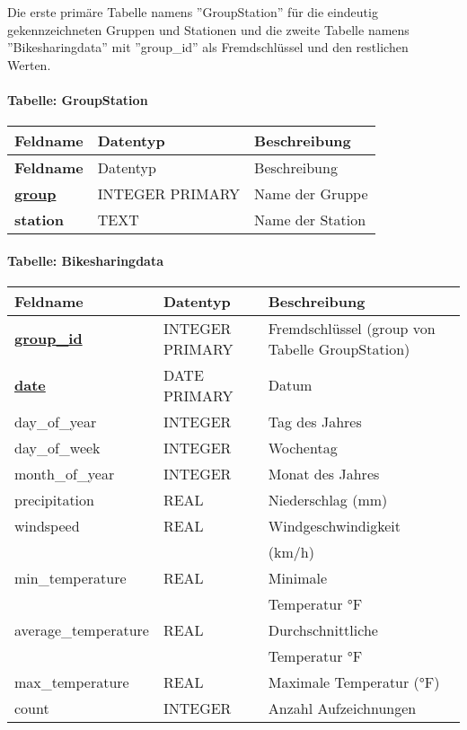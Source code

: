 \documentclass[11pt]{article}
\begin{document}
Die erste primäre Tabelle namens ''GroupStation'' für die eindeutig \\ gekennzeichneten Gruppen und Stationen und die zweite Tabelle namens ''Bikesharingdata'' mit ''group\_id'' als Fremdschlüssel und den restlichen \\ Werten.

\paragraph*{Tabelle: GroupStation}

\begin{longtable}{|>{\bfseries}l|l|l|}
\hline
Feldname & \textbf{Datentyp} & \textbf{Beschreibung} \\
\hline
\endfirsthead
\hline
Feldname & Datentyp & Beschreibung \\
\hline
\endhead
\hline
\underline{group} & INTEGER PRIMARY & Name der Gruppe \\
station & TEXT & Name der Station \\
\hline
\end{longtable}


\paragraph*{Tabelle: Bikesharingdata} 
\RaggedRight
\begin{longtable}{|>{\raggedright\arraybackslash}p{3.5cm}|>{\raggedright\arraybackslash}p{3cm}|>{\raggedright\arraybackslash}p{4cm}|}
\hline 
\textbf{Feldname} & \textbf{Datentyp} & \textbf{Beschreibung} \\
\hline
\underline{\textbf{group\_id}} & INTEGER PRIMARY & Fremdschlüssel (group von Tabelle GroupStation) \\ 
\underline{\textbf{date}} & DATE PRIMARY & Datum \\ 
day\_of\_year & INTEGER & Tag des Jahres \\ 
day\_of\_week & INTEGER & Wochentag \\
month\_of\_year & INTEGER & Monat des Jahres \\ 
precipitation & REAL & Niederschlag (mm) \\ 
windspeed & REAL & Windgeschwindigkeit \\ 
    &   & (km/h) \\
min\_temperature & REAL & Minimale \\ 
    &   & Temperatur °F \\
average\_temperature & REAL & Durchschnittliche \\
    &   & Temperatur °F \\
max\_temperature & REAL & Maximale Temperatur (°F) \\ 
count & INTEGER & Anzahl Aufzeichnungen \\ 
\hline 
\end{longtable}
\end{document}

